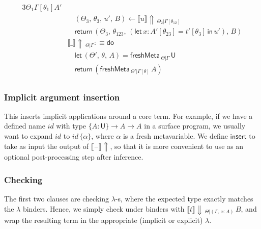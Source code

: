 \documentclass[acmsmall,review,anonymous,prologue,dvipsnames]{acmart}\settopmatter{printfolios=true,printccs=false,printacmref=false}
\newcommand{\slet}{\boldsymbol{\mathsf{let}}}
\renewcommand{\sin}{\boldsymbol{\mathsf{in}}}
\renewcommand{\U}{\mathsf{U}}
\newcommand{\blank}{\mathord{\hspace{1pt}\text{--}\hspace{1pt}}}
\newcommand{\freshMeta}[3]{\mathsf{freshMeta}\,_{#1|#2}\,#3}
\newcommand{\einferblank}{\llbracket\blank\rrbracket\!\Uparrow}
\newcommand{\echeck}[4]{\llbracket#1\rrbracket\!\Downarrow\,_{#2|#3}\,#4}
\newcommand{\einfer}[3]{\llbracket#1\rrbracket\!\Uparrow\,_{#2|#3}}
\newcommand{\edo}{\boldsymbol{\mathsf{do}}}
\newcommand{\ereturn}{\boldsymbol{\mathsf{return}}}
\newcommand{\einsert}{\mathsf{insert}}
\theoremstyle{remark}
\begin{document}
\begin{alignat*}{3}
                {\Theta_1}{\Gamma[\theta_1]}{A'}\\
  &\quad(\Theta_3,\,\theta_3,\,u',\,B) \leftarrow
                \einfer{u}{\Theta_2}{\Gamma[\theta_{12}]}\\
  &\quad\ereturn\,(\Theta_3,\,\theta_{123},\,(\slet\,x:A'[\theta_{23}]=t'[\theta_3]\,\sin\,u'),\,B)\\
  &\einfer{\_}{\Theta}{\Gamma} :\equiv \edo \\
  &\quad \slet\,(\Theta',\,\theta,\,A) = \freshMeta{\Theta}{\Gamma}{\U}\\
  &\quad \ereturn\,(\freshMeta{\Theta'}{\Gamma[\theta]}{A})\\
\end{alignat*}
\endgroup
\subsubsection{Implicit argument insertion}
This inserts implicit applications around a core term. For example, if we have a
defined name $id$ with type $\{A : \U\}\to A \to A$ in a surface program, we
usually want to expand $id$ to $id\,\{\alpha\}$, where $\alpha$ is a fresh
metavariable. We define $\einsert$ to take as input the output of
$\einferblank$, so that it is more convenient to use as an optional
post-processing step after inference.

\subsubsection{Checking}
The first two clauses are checking $\lambda$-s, where the expected type exactly
matches the $\lambda$ binders. Hence, we simply check under binders with
$\echeck{t}{\Theta}{(\Gamma,\,x:A)} B$, and wrap the resulting term in the
appropriate (implicit or explicit) $\lambda$.
\end{document}
